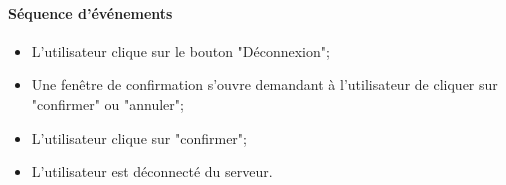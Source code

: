 \paragraph{Séquence d'événements}
\begin{itemize}
	\item L'utilisateur clique sur le bouton "Déconnexion";
	\item Une fenêtre de confirmation s'ouvre demandant à l'utilisateur de cliquer sur "confirmer" ou "annuler";
	\item L'utilisateur clique sur "confirmer";
	\item L'utilisateur est déconnecté du serveur.
\end{itemize}

